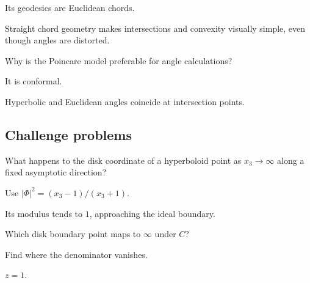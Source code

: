 \begin{hint}
Its geodesics are Euclidean chords.
\end{hint}

\begin{solution}
Straight chord geometry makes intersections and convexity visually simple, even though angles are distorted.
\end{solution}

\begin{exercise}\label{exr:vii31-ped-14}
Why is the Poincare model preferable for angle calculations?
\end{exercise}

\begin{hint}
It is conformal.
\end{hint}

\begin{solution}
Hyperbolic and Euclidean angles coincide at intersection points.
\end{solution}

\subsection*{Challenge problems}

\begin{exercise}\label{exr:vii31-ped-15}
What happens to the disk coordinate of a hyperboloid point as \(x_3\to\infty\) along a fixed asymptotic direction?
\end{exercise}

\begin{hint}
Use \(|\Phi|^2=(x_3-1)/(x_3+1)\).
\end{hint}

\begin{solution}
Its modulus tends to \(1\), approaching the ideal boundary.
\end{solution}

\begin{exercise}\label{exr:vii31-ped-16}
Which disk boundary point maps to \(\infty\) under \(C\)?
\end{exercise}

\begin{hint}
Find where the denominator vanishes.
\end{hint}

\begin{solution}
\(z=1\).
\end{solution}

